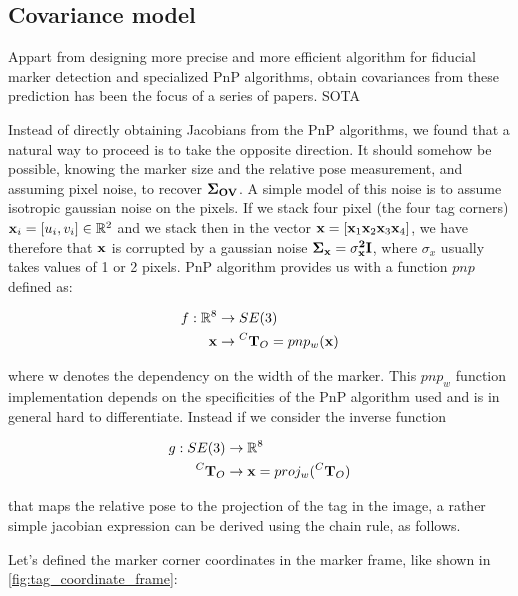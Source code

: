 \subsection{Covariance model}
Appart from designing more precise and more efficient algorithm for fiducial marker detection and specialized PnP algorithms,
 obtain covariances from these prediction has been the focus of a series of papers.
 SOTA

Instead of directly obtaining Jacobians from the PnP algorithms, we found that a natural way to proceed is to take the opposite 
direction. It should somehow be possible, knowing the marker size and the relative pose measurement, and assuming pixel noise, to
recover $\bf \Sigma_{OV}$. A simple model of this noise is to assume isotropic gaussian noise on the pixels. If we stack four pixel (the four tag corners) 
${\bf x}_i = [u_i, v_i] \in \mathbb{R}^2$ and we stack then in the vector ${\bf x} = [{\bf x}_1 {\bf x}_2 {\bf x}_3 {\bf x}_4]$, we have therefore that
${\bf x}$ is corrupted by a gaussian noise $\bf \Sigma_{{\bf x}} = \sigma_{x}^2 {\bf I}$, where $\sigma_{x}$ usually takes values of 1 or 2 pixels.
PnP algorithm provides us with a function $pnp$ defined as:

\begin{equation}
    \begin{split}
        f: \mathbb{R}^8 &\rightarrow SE(3) \\
                           {\bf x} &\rightarrow \prescript{C}{}{{\bf T}}_{O} = pnp_w({\bf x})
    \end{split}
\end{equation}

where w denotes the dependency on the width of the marker. This $pnp_w$ function implementation depends on the specificities of the PnP algorithm used and  
is in general hard to differentiate. Instead if we consider the inverse function

\begin{equation}
    \begin{split}
        g: SE(3) &\rightarrow \mathbb{R}^8 \\
                           \prescript{C}{}{{\bf T}}_{O} &\rightarrow {\bf x} = proj_w(\prescript{C}{}{{\bf T}}_{O})
    \end{split}
\end{equation}

that maps the relative pose to the projection of the tag in the image, a rather simple jacobian expression can be derived using the chain rule, as follows.

Let's defined the marker corner coordinates in the marker frame, like shown in \fig \ref{fig:tag_coordinate_frame}:

